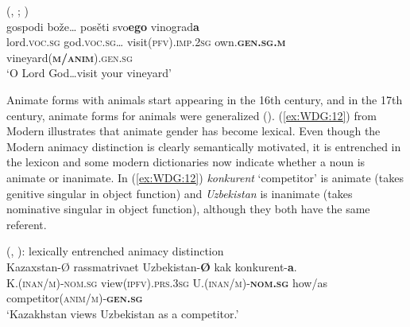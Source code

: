 \documentclass[output=collectionpaper]{langsci/langscibook}
\begin{document}
\ea\label{ex:WDG:11}
 (, ; \citealt[267]{Dietze1973})\\
\gll gospodi	bože{\dots}	posěti	svo\textbf{ego}	vinograd\textbf{a}\\
lord.\textsc{voc.sg}	god.\textsc{voc.sg}{\dots}	visit(\textsc{pfv}).\textsc{imp.2sg}	own.\textbf{\textsc{gen.sg.m}}	vineyard(\textbf{\textsc{m/anim}}).\textsc{gen.sg}\\
\glt `O Lord God{\dots}visit your vineyard'\\
\z

Animate forms with animals start appearing in the 16th century, and in the 17th century, animate forms for animals were generalized (\citealt[270]{Dietze1973}). (\ref{ex:WDG:12}) from Modern  illustrates that animate gender has become lexical. Even though the Modern  animacy distinction is clearly semantically motivated, it is entrenched in the lexicon and some modern dictionaries now indicate whether a noun is animate or inanimate. In (\ref{ex:WDG:12}) \textit{konkurent} `competitor' is animate (takes genitive singular in object function) and \textit{Uzbekistan} is inanimate (takes nominative singular in object function), although they both have the same referent.

\ea\label{ex:WDG:12}
 (, ): lexically entrenched animacy distinction\\
\gll Kazaxstan-Ø	rassmatrivaet	Uzbekistan-\textbf{Ø}	kak	konkurent-\textbf{a}.\\
K.(\textsc{inan/m)-nom.sg}	view(\textsc{ipfv}).\textsc{prs.3sg}	U.(\textsc{inan/m})-\textbf{\textsc{nom.sg}}	how/as	competitor(\textsc{anim/m})-\textbf{\textsc{gen.sg}}\\
\glt `Kazakhstan views Uzbekistan as a competitor.'\\
\z
\end{document}
